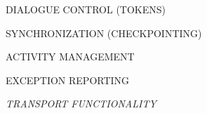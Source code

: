 %


%


\begin{bwslide}

\begin{nrtc}
\item	DIALOGUE CONTROL (TOKENS)
\item	SYNCHRONIZATION (CHECKPOINTING)
\item	ACTIVITY MANAGEMENT
\item	EXCEPTION REPORTING
\item	{\em TRANSPORT FUNCTIONALITY}
\end{nrtc}
\end{bwslide}


%


